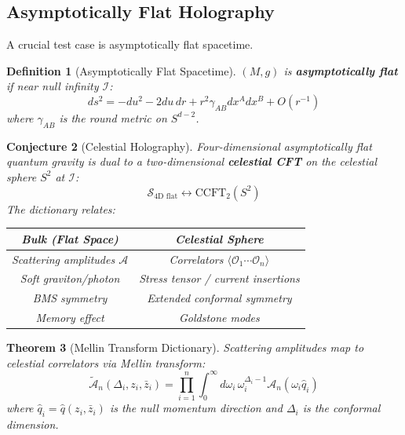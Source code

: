 \documentclass[12pt,a4paper]{article}
\newtheorem{theorem}{Theorem}[section]
\newtheorem{conjecture}[theorem]{Conjecture}
\newtheorem{definition}[theorem]{Definition}
\begin{document}
\subsection{Asymptotically Flat Holography}

A crucial test case is asymptotically flat spacetime.

\begin{definition}[Asymptotically Flat Spacetime]
$(M, g)$ is \textbf{asymptotically flat} if near null infinity $\mathcal{I}$:
\begin{equation}
ds^2 = -du^2 - 2du \, dr + r^2 \gamma_{AB} dx^A dx^B + O(r^{-1})
\end{equation}
where $\gamma_{AB}$ is the round metric on $S^{d-2}$.
\end{definition}

\begin{conjecture}[Celestial Holography]
Four-dimensional asymptotically flat quantum gravity is dual to a two-dimensional \textbf{celestial CFT} on the celestial sphere $S^2$ at $\mathcal{I}$:
\begin{equation}
\mathcal{S}_{\text{4D flat}} \longleftrightarrow \text{CCFT}_2(S^2)
\end{equation}
The dictionary relates:
\begin{center}
\renewcommand{\arraystretch}{1.4}
\begin{tabular}{c|c}
\textbf{Bulk (Flat Space)} & \textbf{Celestial Sphere} \\
\hline
Scattering amplitudes $\mathcal{A}$ & Correlators $\langle \mathcal{O}_1 \cdots \mathcal{O}_n \rangle$ \\
Soft graviton/photon & Stress tensor / current insertions \\
BMS symmetry & Extended conformal symmetry \\
Memory effect & Goldstone modes \\
\end{tabular}
\end{center}
\end{conjecture}

\begin{theorem}[Mellin Transform Dictionary]
Scattering amplitudes map to celestial correlators via Mellin transform:
\begin{equation}
\tilde{\mathcal{A}}_n(\Delta_i, z_i, \bar{z}_i) = \prod_{i=1}^n \int_0^\infty d\omega_i \, \omega_i^{\Delta_i - 1} \mathcal{A}_n(\omega_i \hat{q}_i)
\end{equation}
where $\hat{q}_i = \hat{q}(z_i, \bar{z}_i)$ is the null momentum direction and $\Delta_i$ is the conformal dimension.
\end{theorem}
\end{document}
